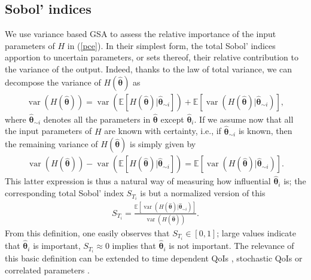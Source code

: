 \subsection{Sobol' indices} 
\label{sec:gsa}
We use variance based GSA to assess the relative importance of the input parameters of $H$ in (\ref{pce}). In their simplest form, the total Sobol' indices \cite{saltellitotalindex} apportion to uncertain parameters, or sets thereof, their relative contribution to the variance of the output. Indeed, thanks to the law of total variance, we can decompose the variance of $H(\hat{\boldsymbol{\theta}})$ as
\begin{eqnarray}
\operatorname{var}(H(\hat{\boldsymbol{\theta}})) = \operatorname{var}(\mathbb E[H(\hat{\boldsymbol{\theta}})|\hat{\boldsymbol{\theta}}_{\sim i}]) + \mathbb E[\operatorname{var}(H(\hat{\boldsymbol{\theta}})|\hat{\boldsymbol{\theta}}_{\sim i})], \label{ltv}
\end{eqnarray}
where $\hat{\boldsymbol{\theta}}_{\sim i}$ denotes all the parameters in $\hat{\boldsymbol{\theta}}$ except $\hat{\boldsymbol{\theta}}_i$. If we assume now that all the input parameters of $H$ are known with certainty, i.e., if $\hat{\boldsymbol{\theta}}_{\sim i}$ is known, then the remaining variance of $H(\hat{\boldsymbol{\theta}})$ is simply given by 
\begin{eqnarray*}
\operatorname{var}(H(\hat{\boldsymbol{\theta}})) - \operatorname{var}(\mathbb E[H(\hat{\boldsymbol{\theta}})|\hat{\boldsymbol{\theta}}_{\sim i}]) = \mathbb E[\operatorname{var}(H(\hat{\boldsymbol{\theta}})|\hat{\boldsymbol{\theta}}_{\sim i})]. 
\end{eqnarray*}
This latter expression is thus a natural way of measuring how influential $\hat{\boldsymbol{\theta}}_i$ is; the corresponding total Sobol' index $S_{T_i}$ is but a normalized version of this
\begin{eqnarray}
S_{T_i} = \frac{\mathbb E[\operatorname{var}(H(\hat{\boldsymbol{\theta}})|\hat{\boldsymbol{\theta}}_{\sim i})]}{\operatorname{var}(H(\hat{\boldsymbol{\theta}})) }. \label{sobol}
\end{eqnarray}
From this definition, one easily observes that $S_{T_i} \in [0,1]$; large values indicate that $\hat{\boldsymbol{\theta}}_i$ is important, $S_{T_i} \approx 0$ implies that $\hat{\boldsymbol{\theta}}_i$ is not important.
The relevance of this basic definition can be extended to time dependent QoIs \cite{timegsa}, stochastic QoIs \cite{stogsa} or correlated parameters \cite{corvar}.



